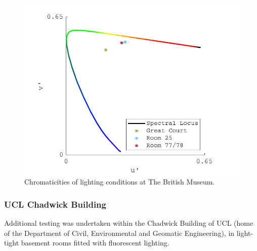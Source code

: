 \begin{figure}[hbtp]
\includegraphics[max width=\textwidth]{figs/tablet/BM_chromaticities.pdf}
\caption{Chromaticities of lighting conditions at The British Museum.}
\label{fig:BMchromaticities}
\end{figure}

\subsubsection{UCL Chadwick Building} \label{sec:Chadwick}

Additional testing was undertaken within the Chadwick Building of \gls{UCL} (home of the Department of Civil, Environmental and Geomatic Engineering), in light-tight basement rooms fitted with fluorescent lighting.




